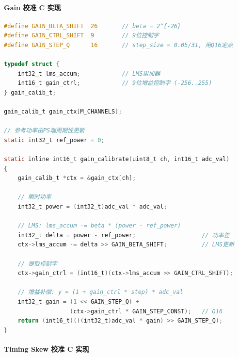 \documentclass[UTF8,a4paper,11pt]{ctexart}
\begin{document}
\paragraph{Gain 校准 C 实现}

\begin{lstlisting}[language=C, caption={Gain校准：C语言定点实现}]
#define GAIN_BETA_SHIFT  26       // beta = 2^{-26}
#define GAIN_CTRL_SHIFT  9        // 9位控制字
#define GAIN_STEP_Q      16       // step_size = 0.05/31, 用Q16定点

typedef struct {
    int32_t lms_accum;            // LMS累加器
    int16_t gain_ctrl;            // 9位增益控制字 (-256..255)
} gain_calib_t;

gain_calib_t gain_ctx[M_CHANNELS];

// 参考功率由PS端周期性更新
static int32_t ref_power = 0;

static inline int16_t gain_calibrate(uint8_t ch, int16_t adc_val)
{
    gain_calib_t *ctx = &gain_ctx[ch];
    
    // 瞬时功率
    int32_t power = (int32_t)adc_val * adc_val;
    
    // LMS: lms_accum -= beta * (power - ref_power)
    int32_t delta = power - ref_power;                   // 功率差
    ctx->lms_accum -= delta >> GAIN_BETA_SHIFT;          // LMS更新
    
    // 提取控制字
    ctx->gain_ctrl = (int16_t)(ctx->lms_accum >> GAIN_CTRL_SHIFT);
    
    // 增益补偿: y = (1 + gain_ctrl * step) * adc_val
    int32_t gain = (1 << GAIN_STEP_Q) + 
                   (ctx->gain_ctrl * GAIN_STEP_CONST);   // Q16
    return (int16_t)(((int32_t)adc_val * gain) >> GAIN_STEP_Q);
}
\end{lstlisting}

\paragraph{Timing Skew 校准 C 实现}
\end{document}
